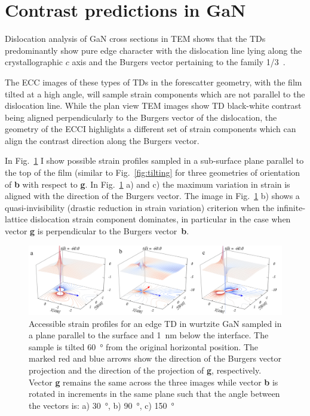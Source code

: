 \section{Contrast predictions in GaN}
\label{sec:contrastGaN}
Dislocation analysis of GaN cross sections in TEM shows that the TDs predominantly show pure edge character with the dislocation line lying along the crystallographic $c$ axis and the Burgers vector pertaining to the family  1/3~\cite{Hino00}.

The ECC images of these types of TDs in the forescatter geometry, with the film tilted at a high angle, will sample strain components which are not parallel to the dislocation line. While the plan view TEM images show TD black-white contrast being aligned perpendicularly to the  Burgers vector of the dislocation, the geometry of the ECCI highlights a different set of strain components which can align the contrast direction along the Burgers vector.

In Fig.~\ref{fig:rotateEdge} I show possible strain profiles sampled in a sub-surface plane parallel to the top of the film (similar to Fig.~\ref{fig:tilting} for three geometries of orientation of \textbf{b} with respect to \textbf{g}. In Fig.~\ref{fig:rotateEdge} a) and c) the maximum variation in strain is aligned with the direction of the Burgers vector. The image in Fig.~\ref{fig:rotateEdge} b) shows a quasi-invisibility (drastic reduction in strain variation) criterion when the infinite-lattice dislocation strain component dominates, in particular in the case when vector \textbf{g} is perpendicular to the Burgers vector~\textbf{b}.

\begin{figure}[ht]
    \centering
    \includegraphics[width=1.1\linewidth]{Figures/rotateEdge.png}
    \caption[Edge TD ECC-strain in different orientations.]{Accessible strain profiles for an edge TD in wurtzite GaN sampled in a plane parallel  to the surface and \SI{1}{\nano \meter} below the interface. The sample is tilted  \SI{60}{\degree} from the original horizontal position. The marked red and blue arrows show the direction of the Burgers vector projection and the direction of the projection of \textbf{g}, respectively. Vector\textbf{ g} remains the same across the three images while vector \textbf{b} is rotated in  increments in the same plane such that the angle between the vectors is: a) \SI{30}{\degree}, b) \SI{90}{\degree}, c) \SI{150}{\degree} }
    \label{fig:rotateEdge}
\end{figure}


